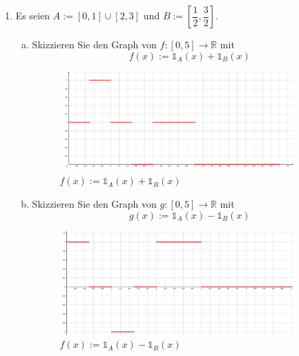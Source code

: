 \documentclass[10pt, oneside]{article}
\begin{document}
\begin{enumerate}[1.]
    \item Es seien $A := [0,1] \cup [2,3]$ und $B := [\dfrac{1}{2},
        \dfrac{3}{2}]$. 
        
        \begin{enumerate}[(a)]
            \item Skizzieren Sie den Graph von $f : [0,5] \longrightarrow
                \mathbb{R}$ mit $$f(x) := \mathds{1}_A(x) + \mathds{1}_B(x)$$

                \begin{figure}[h]
                    \centering
                    \includegraphics[width=0.9\textwidth]{./assets/18-01.png}
                    \caption{$f(x) := \mathds{1}_A(x) + \mathds{1}_B(x)$}
                \end{figure}

            \item Skizzieren Sie den Graph von $g: [0, 5] \longrightarrow
                \mathbb{R}$ mit $$g(x) := \mathds{1}_A(x) - \mathds{1}_B(x)$$

                \begin{figure}[h]
                    \centering
                    \includegraphics[width=0.9\textwidth]{./assets/18-02.png}
                    \caption{$f(x) := \mathds{1}_A(x) - \mathds{1}_B(x)$}
                \end{figure}
        \end{enumerate}
\end{enumerate}
\end{document}
